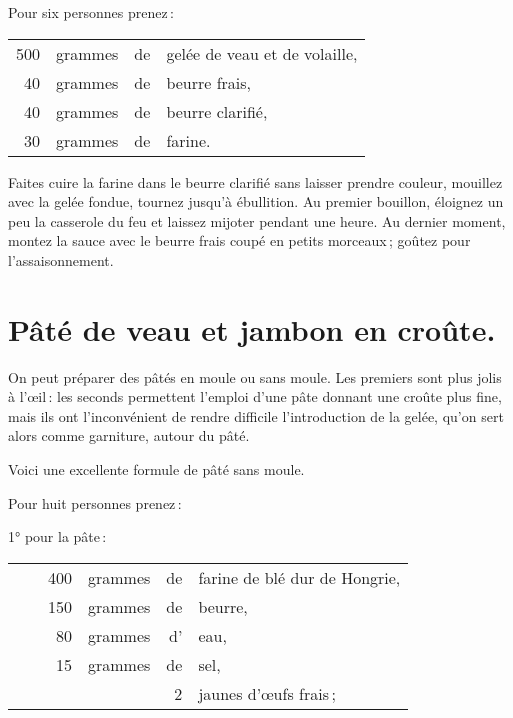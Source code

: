 Pour six personnes prenez :

\footnotesize
\begin{longtable}{rrrp{16em}}
    500 & grammes & de & gelée de veau et de volaille,                                                    \\
     40 & grammes & de & beurre frais,                                                                    \\
     40 & grammes & de & beurre clarifié,                                                                 \\
     30 & grammes & de & farine.                                                                          \\
\end{longtable}
\normalsize

Faites cuire la farine dans le beurre clarifié sans laisser prendre couleur,
mouillez avec la gelée fondue, tournez jusqu'à ébullition. Au premier bouillon,
éloignez un peu la casserole du feu et laissez mijoter pendant une heure. Au
dernier moment, montez la sauce avec le beurre frais coupé en petits morceaux ;
goûtez pour l'assaisonnement.

\section*{\centering Pâté de veau et jambon en croûte.}
{}

On peut préparer des pâtés en moule ou sans moule. Les premiers sont plus jolis
à l'œil : les seconds permettent l'emploi d'une pâte donnant une croûte plus
fine, mais ils ont l'inconvénient de rendre difficile l'introduction de la
gelée, qu'on sert alors comme garniture, autour du pâté.

Voici une excellente formule de pâté sans moule.

\medskip

Pour huit personnes prenez :

\smallskip

\label{pg504} \hypertarget{p504}{}
1° pour la pâte :

\footnotesize
\begin{longtable}{rp{2em}rrrp{16em}}
& & 400 & grammes & de & farine de blé dur de Hongrie,                                                    \\
& & 150 & grammes & de & beurre,                                                                          \\
& &  80 & grammes & d' & eau,                                                                             \\
& &  15 & grammes & de & sel,                                                                             \\
& &     &         &  2 & jaunes d'œufs frais ;                                                            \\
\end{longtable}
\normalsize

